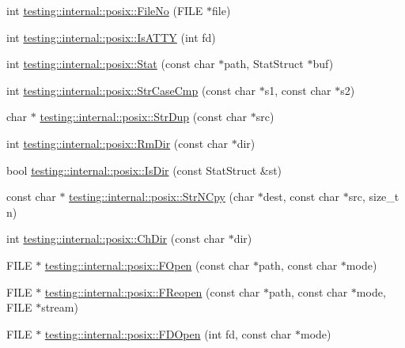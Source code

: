 \begin{DoxyCompactItemize}
int \hyperlink{namespacetesting_1_1internal_1_1posix_a3117b067e1f942a2031e666953120ccc}{testing\+::internal\+::posix\+::\+File\+No} (F\+I\+L\+E $\ast$file)
\item 
int \hyperlink{namespacetesting_1_1internal_1_1posix_a16ebe936b3a8ea462a94191635aedc27}{testing\+::internal\+::posix\+::\+Is\+A\+T\+T\+Y} (int fd)
\item 
int \hyperlink{namespacetesting_1_1internal_1_1posix_a2b87b7ff647a128614daf50667eb9304}{testing\+::internal\+::posix\+::\+Stat} (const char $\ast$path, Stat\+Struct $\ast$buf)
\item 
int \hyperlink{namespacetesting_1_1internal_1_1posix_a1ef2385a7f8e4c706054da35967e76bd}{testing\+::internal\+::posix\+::\+Str\+Case\+Cmp} (const char $\ast$s1, const char $\ast$s2)
\item 
char $\ast$ \hyperlink{namespacetesting_1_1internal_1_1posix_a8e352884793a65ae8be144676f1a9136}{testing\+::internal\+::posix\+::\+Str\+Dup} (const char $\ast$src)
\item 
int \hyperlink{namespacetesting_1_1internal_1_1posix_acbad5d4ea5b73fd1765f5f760642932a}{testing\+::internal\+::posix\+::\+Rm\+Dir} (const char $\ast$dir)
\item 
bool \hyperlink{namespacetesting_1_1internal_1_1posix_af0d04ed5baeed28353fa38742748a421}{testing\+::internal\+::posix\+::\+Is\+Dir} (const Stat\+Struct \&st)
\item 
const char $\ast$ \hyperlink{namespacetesting_1_1internal_1_1posix_a36fca815713332e5c6dc92c98b6b2574}{testing\+::internal\+::posix\+::\+Str\+N\+Cpy} (char $\ast$dest, const char $\ast$src, size\+\_\+t n)
\item 
int \hyperlink{namespacetesting_1_1internal_1_1posix_a1ddc8a4fc6bb21da372307485591a212}{testing\+::internal\+::posix\+::\+Ch\+Dir} (const char $\ast$dir)
\item 
F\+I\+L\+E $\ast$ \hyperlink{namespacetesting_1_1internal_1_1posix_a4042201dcc4932641d484e7ddf94de7d}{testing\+::internal\+::posix\+::\+F\+Open} (const char $\ast$path, const char $\ast$mode)
\item 
F\+I\+L\+E $\ast$ \hyperlink{namespacetesting_1_1internal_1_1posix_a9ef6d089cdae03f9d9e0e6d379c40703}{testing\+::internal\+::posix\+::\+F\+Reopen} (const char $\ast$path, const char $\ast$mode, F\+I\+L\+E $\ast$stream)
\item 
F\+I\+L\+E $\ast$ \hyperlink{namespacetesting_1_1internal_1_1posix_af7c268eba32d5a718b36b6b3801302e0}{testing\+::internal\+::posix\+::\+F\+D\+Open} (int fd, const char $\ast$mode)

\end{DoxyCompactItemize}
